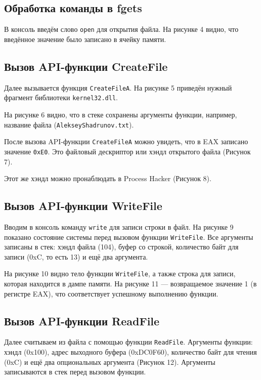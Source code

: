 \subsection{Обработка команды в fgets}
В консоль введём слово \texttt{open} для открытия файла. На рисунке 4 видно, что введённое значение было записано в ячейку памяти.

\FloatBarrier


\subsection{Вызов API-функции CreateFile}
Далее вызывается функция \texttt{CreateFileA}. На рисунке 5 приведён нужный фрагмент библиотеки \texttt{kernel32.dll}.

На рисунке 6 видно, что в стеке сохранены аргументы функции, например, название файла (\texttt{AlekseyShadrunov.txt}). 

После вызова API-функции \texttt{CreateFileA} можно увидеть, что в EAX записано
значение \texttt{0xE0}. Это файловый дескриптор или хэндл открытого файла (Рисунок 7). 

Этот же хэндл можно пронаблюдать в Process Hacker (Рисунок 8). 
\FloatBarrier



\subsection{Вызов API-функции WriteFile}
Вводим в консоль команду \texttt{write} для записи строки в файл. На рисунке 9 показано состояние системы перед вызовом функции \texttt{WriteFile}. Все аргументы записаны в стек: хэндл файла (104), буфер со строкой, количество байт для записи (0xC, то есть 13) и ещё два аргумента. 

На рисунке 10 видно тело функции \texttt{WriteFile}, а также строка для записи, которая находится в дампе памяти. На рисунке 11 — возвращаемое значение 1 (в регистре EAX), что соответствует успешному выполнению функции.
\FloatBarrier


\subsection{Вызов API-функции ReadFile}
Далее считываем из файла с помощью функции \texttt{ReadFile}. Аргументы функции: хэндл (0x100), адрес выходного буфера (0xDC0F60), количество байт для чтения (0xC) и ещё два опциональных аргумента (Рисунок 12). Аргументы записываются в стек перед вызовом функции.

